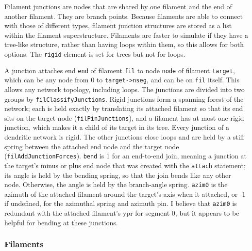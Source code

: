 \documentclass {scrbook}
\newcommand {\ttt} {\texttt}
\begin{document}
Filament junctions are nodes that are shared by one filament and the end of another filament. They are branch points. Because filaments are able to connect with those of different types, filament junction structures are stored as a list within the filament superstructure. Filaments are faster to simulate if they have a tree-like structure, rather than having loops within them, so this allows for both options. The \ttt{rigid} element is set for trees but not for loops.

A junction attaches end \ttt{end} of filament \ttt{fil} to node \ttt{node} of filament \ttt{target}, which can be any node from 0 to \ttt{target->nseg}, and can be on \ttt{fil} itself. This allows any network topology, including loops. The junctions are divided into two groups by \ttt{filClassifyJunctions}. Rigid junctions form a spanning forest of the network; each is held exactly by translating its attached filament so that its end sits on the target node (\ttt{filPinJunctions}), and a filament has at most one rigid junction, which makes it a child of its target in its tree. Every junction of a dendritic network is rigid. The other junctions close loops and are held by a stiff spring between the attached end node and the target node (\ttt{filAddJunctionForces}). \ttt{bend} is 1 for an end-to-end join, meaning a junction at the target's minus or plus end node that was created with the \ttt{attach} statement; its angle is held by the bending spring, so that the join bends like any other node. Otherwise, the angle is held by the branch-angle spring. \ttt{azim0} is the azimuth of the attached filament around the target's axis when it attached, or -1 if undefined, for the azimuthal spring and azimuth pin. I believe that \ttt{azim0} is redundant with the attached filament's ypr for segment 0, but it appears to be helpful for bending at these junctions.

\subsubsection{Filaments}
\end{document}
